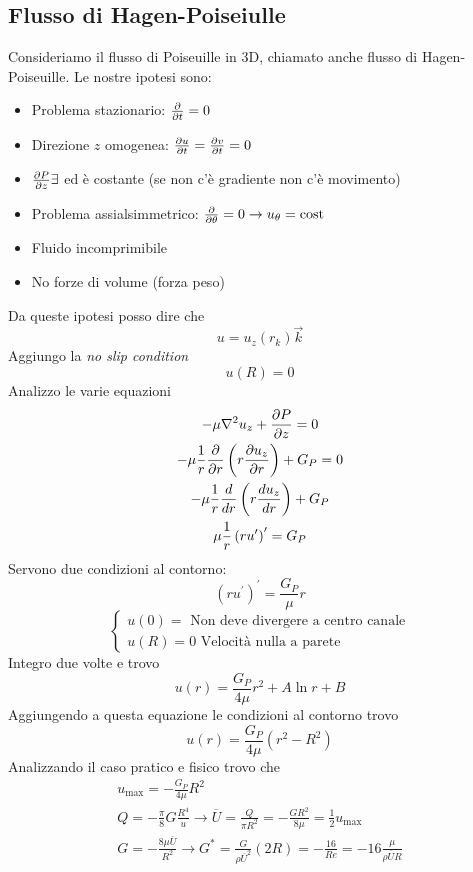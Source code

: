 \subsection{Flusso di Hagen-Poiseiulle}
Consideriamo il flusso di Poiseuille in 3D, chiamato anche flusso di Hagen-Poiseuille.
Le nostre ipotesi sono:
\begin{itemize}
\item Problema stazionario: $ \frac{\partial}{\partial t}=0 $ 
\item Direzione $ z $ omogenea: $ \frac{\partial u}{\partial t}=\frac{\partial v}{\partial t} =0 $
\item $ \frac{\partial P}{\partial z} \exists $ ed è costante (se non c'è gradiente non c'è movimento)
\item Problema assialsimmetrico: $ \frac{\partial}{\partial\theta }=0 \rightarrow u_\theta =\operatorname{cost} $
\item Fluido incomprimibile
\item No forze di volume (forza peso)  
\end{itemize}
Da queste ipotesi posso dire che 
\[
  u = u_z\left( r_k\right) \vec{k}
\]
Aggiungo la \emph{no slip condition}
\[
  u\left( R\right) =0
\]
Analizzo le varie equazioni
\begin{gather*}
  -\mu \nabla^2u_z + \frac{\partial P}{\partial z}=0\\
  -\mu \frac{1}{r}\frac{\partial}{\partial r}\left( r\frac{\partial u_z}{\partial r}\right) +G_P=0\\
  -\mu \frac{1}{r}\frac{d }{d r}\left( r\frac{d u_z}{dr }\right) +G_P\\
  \mu \frac{1}{r}\left( r u^{\prime}\right)^{\prime}=G_P
\end{gather*}
Servono due condizioni al contorno:
\[
  \left( ru^{\prime}\right) ^{\prime}=\frac{G_P}{\mu }r
\]
\begin{equation*}
  \begin{cases}
    u\left( 0\right) = \text{ Non deve divergere a centro canale} \\
    u\left( R\right) =0 \text{ Velocità nulla a parete} 
  \end{cases}
\end{equation*}
Integro due volte e trovo 
\[
  u\left( r\right)  = \frac{G_P}{4\mu }r^2+A\ln r+B
\]
Aggiungendo a questa equazione le condizioni al contorno trovo 
\begin{equation}
  u\left( r\right) = \frac{G_P}{4\mu }\left( r^2-R^2\right) 
\end{equation}
Analizzando il caso pratico e fisico trovo che 
\begin{gather*}
  u_{\text{max}} = - \frac{G_P}{4\mu }R^2\\
  Q = -\frac{\pi}{8}G \frac{R^4}{u} \rightarrow \overline{U} = \frac{Q}{\pi R^2}=-\frac{GR^2}{8\mu }=\frac{1}{2}u_{\text{max}}\\
  G = - \frac{{8 \mu \overline{U}}}{R^2}\rightarrow G^* = \frac{G}{\rho \overline{U}^2}\left( 2R\right) = -\frac{16}{Re}=-16\frac{\mu}{\rho \overline{U}R}
\end{gather*}
